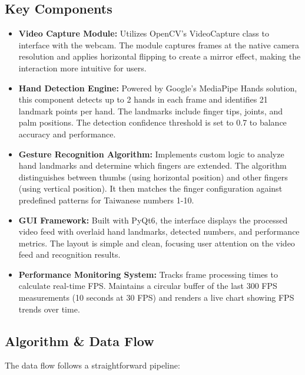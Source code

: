 \documentclass{article}
\begin{document}
\subsection{Key Components}

\begin{itemize}
	\item \textbf{Video Capture Module:} Utilizes OpenCV's VideoCapture class to interface with the webcam. The module captures frames at the native camera resolution and applies horizontal flipping to create a mirror effect, making the interaction more intuitive for users.

\item \textbf{Hand Detection Engine:} Powered by Google's MediaPipe Hands solution, this component detects up to 2 hands in each frame and identifies 21 landmark points per hand. The landmarks include finger tips, joints, and palm positions. The detection confidence threshold is set to 0.7 to balance accuracy and performance.

\item \textbf{Gesture Recognition Algorithm:} Implements custom logic to analyze hand landmarks and determine which fingers are extended. The algorithm distinguishes between thumbs (using horizontal position) and other fingers (using vertical position). It then matches the finger configuration against predefined patterns for Taiwanese numbers 1-10.

\item \textbf{GUI Framework:} Built with PyQt6, the interface displays the processed video feed with overlaid hand landmarks, detected numbers, and performance metrics. The layout is simple and clean, focusing user attention on the video feed and recognition results.

\item \textbf{Performance Monitoring System:} Tracks frame processing times to calculate real-time FPS. Maintains a circular buffer of the last 300 FPS measurements (10 seconds at 30 FPS) and renders a live chart showing FPS trends over time.

\end{itemize}

\subsection{Algorithm \& Data Flow}

The data flow follows a straightforward pipeline:
\end{document}
